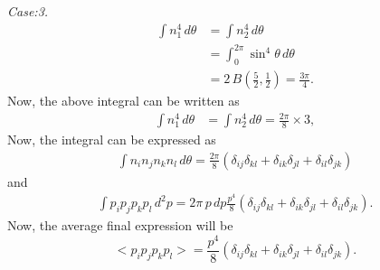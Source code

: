 \documentclass[%
 reprint,
 amsmath,amssymb,
 aps,
]{revtex4-2}
\begin{document}
    {\it Case:3.}\\
    \begin{align}
        \int n_1^4\, d\theta &=  \int n_2^4\, d\theta \\
        & = \int_0^{2 \pi} \sin^4{\theta} \, d\theta\\ 
        & = 2 \, B\left( \frac{5}{2}, \frac{1}{2}\right) = \frac{3 \pi}{4}.
    \end{align}
    Now, the above integral can be written as
    \begin{align}
        \int n_1^4\, d\theta &= \int n_2^4\, d\theta = \frac{2 \pi}{8}\times 3,
    \end{align}
    Now, the integral can be expressed as
    \begin{align}
        \int n_i n_j n_k n_l \,d\theta = \frac{2\pi }{8} \left( \delta_{ij}\delta_{kl} + \delta_{ik}\delta_{jl} + \delta_{il}\delta_{jk}\right)
    \end{align}
    and
    \begin{align}
        \int p_i p_j p_k p_l \, d^2p = 2\pi \, p\,dp \frac{p^4}{8}\left( \delta_{ij}\delta_{kl} + \delta_{ik}\delta_{jl} + \delta_{il}\delta_{jk}\right).
    \end{align}
    Now, the average final expression will be
    \begin{equation}
        <p_i p_j p_k p_l> = \frac{p^4}{8}\left( \delta_{ij}\delta_{kl} + \delta_{ik}\delta_{jl} + \delta_{il}\delta_{jk}\right).
    \end{equation}
%
%	
    
%
    
\end{document}
